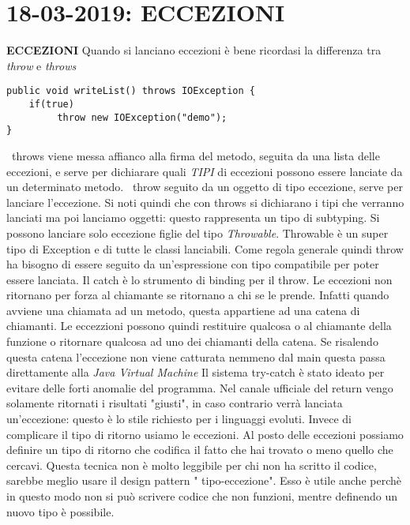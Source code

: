 

\newpage
\section{18-03-2019: ECCEZIONI}
\textbf{ECCEZIONI} \newline
Quando si lanciano eccezioni è bene ricordasi la differenza tra \textit{throw} e \textit{throws}
\begin{lstlisting}[basicstyle=\small,]
public void writeList() throws IOException {
	if(true)
		 throw new IOException("demo"); 
}
\end{lstlisting}
\textbullet\ throws viene messa affianco alla firma del metodo, seguita da una lista delle eccezioni, e serve per dichiarare quali \textit{TIPI} di eccezioni possono essere lanciate da un determinato metodo. \newline
\textbullet\ throw seguito da un oggetto di tipo eccezione, serve per lanciare l'eccezione. \newline
Si noti quindi che con throws si dichiarano i tipi che verranno lanciati ma poi lanciamo oggetti: questo rappresenta un tipo di subtyping.
\newline
Si possono lanciare solo eccezione figlie del tipo \textit{Throwable}. Throwable è un super tipo di Exception e di tutte le classi lanciabili. \newline
Come regola generale quindi throw ha bisogno di essere seguito da un'espressione con tipo compatibile per poter essere lanciata.\newline
Il catch è lo strumento di binding per il throw. \newline
Le eccezioni non ritornano  per forza al chiamante se ritornano a chi se le prende. Infatti quando avviene una chiamata ad un metodo, questa appartiene ad una catena di chiamanti. Le eccezzioni possono quindi restituire qualcosa o al chiamante della funzione o ritornare qualcosa ad uno dei chiamanti della catena. Se risalendo questa catena l'eccezione non viene catturata nemmeno dal main questa passa direttamente alla \textit{Java Virtual Machine}\newline
Il sistema try-catch è stato ideato per evitare delle forti anomalie del programma. \newline
Nel canale ufficiale del return vengo solamente ritornati i risultati "giusti", in caso contrario verrà lanciata un'eccezione: questo è lo stile richiesto per i linguaggi evoluti. Invece di complicare il tipo di ritorno usiamo le eccezioni. \newline
Al posto delle eccezioni possiamo definire  un tipo di ritorno che codifica il fatto che hai trovato o meno quello che cercavi. Questa tecnica non è molto leggibile per chi non ha scritto il codice, sarebbe meglio usare il design pattern " tipo-eccezione". Esso è utile anche perchè in questo modo non si può scrivere codice che non funzioni, mentre definendo un nuovo tipo è possibile.


